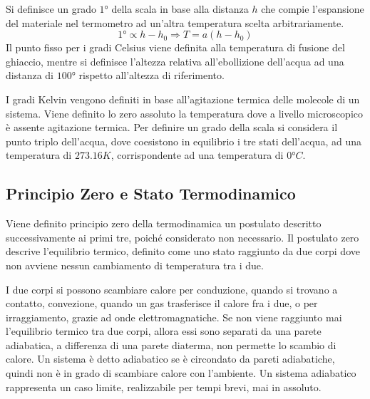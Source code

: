 \documentclass{article}
\numberwithin{equation}{subsection}
\begin{document}
Si definisce un grado $1\mbox{°}$ della scala in base alla distanza $h$  
che compie l'espansione del materiale nel termometro ad un'altra temperatura 
scelta arbitrariamente.
\begin{equation*}
    1\mbox{°}\propto h-h_0\Rightarrow T=a(h-h_0)
\end{equation*}
Il punto fisso per i gradi Celsius viene definita 
alla temperatura di fusione del ghiaccio, mentre si definisce 
l'altezza relativa all'ebollizione dell'acqua ad una distanza 
di $100\mbox{°}$ rispetto all'altezza di riferimento.



I gradi Kelvin vengono definiti in base 
all'agitazione termica delle molecole di un sistema. Viene 
definito lo zero assoluto la temperatura dove a livello 
microscopico è assente agitazione termica. Per definire un grado 
della scala si considera il punto triplo dell'acqua, dove coesistono in equilibrio i tre stati dell'acqua, ad una temperatura di $273.16K$, 
corrispondente ad una temperatura di $0\mbox{°}C$. 
\begin{center}\end{center}

\subsection{Principio Zero e Stato Termodinamico}
Viene definito principio zero della termodinamica un postulato descritto 
successivamente ai primi tre, poiché considerato non necessario. 
Il postulato zero descrive l'equilibrio termico, definito 
come uno stato raggiunto da due corpi dove non avviene nessun 
cambiamento di temperatura tra i due. 



I due corpi si possono scambiare calore per conduzione, quando si trovano a contatto, convezione, quando un gas trasferisce il calore fra i due, o per irraggiamento, 
grazie ad onde elettromagnatiche. Se non viene raggiunto mai l'equilibrio termico tra due corpi, allora essi sono separati da una parete adiabatica, a differenza di una parete 
diaterma, non permette lo scambio di calore. 
Un sistema è detto adiabatico se è circondato da pareti adiabatiche, quindi non è in grado di scambiare calore con l'ambiente. 
Un sistema adiabatico rappresenta un caso limite, realizzabile per tempi brevi, mai in assoluto. 
\end{document}
